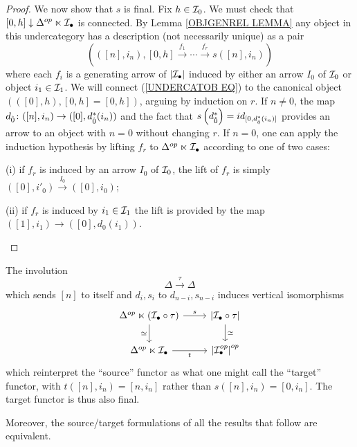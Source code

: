\documentclass[a4paper,10pt]{article}%
\begin{document}
\begin{proof}
We now show that $s$ is final.
Fix $h \in \mathcal{I}_0$. We must check that 
$[0,h] \downarrow \Delta^{op} \ltimes \mathcal{I}_{\bullet}$ is connected.
By Lemma \ref{OBJGENREL LEMMA} any object 
 in this undercategory has a description (not necessarily unique) as a pair
\begin{equation}\label{UNDERCATOB EQ}
\left(\left([n],i_n\right), [0,h] \xrightarrow{f_1} \cdots \xrightarrow{f_r} s([n],i_n) \right)
\end{equation}
where each $f_i$ is a generating arrow of $|\mathcal{I}_{\bullet}|$
induced by either an arrow $I_0$ of $\mathcal{I}_0$ or object $i_1\in \mathcal{I}_1$.
 We will connect (\ref{UNDERCATOB EQ}) to the canonical object 
 $\left(([0],h),[0,h]=[0,h]\right)$, arguing by induction on $r$. 
If $n \neq 0$, the map 
$d_{\hat{0}} \colon ([n],i_n) \to ([0],d_{\hat{0}}^{\**}(i_n))$
 and the fact that 
$s \left(d_{\hat{0}}^{\**}\right) = id_{[0, d_{\hat{0}}^{\**}(i_n)]}$ provides an arrow to an object with $n=0$ without changing $r$.
If $n=0$, one can apply the induction hypothesis by lifting $f_r$ to $\Delta^{op} \ltimes \mathcal{I}_{\bullet}$ according to one of two cases:
\begin{inparaenum}
	\item[(i)] if $f_r$ is induced by an arrow $I_0$ of $\mathcal{I}_0$, the lift of $f_r$ is simply  
	$([0],i'_0) \xrightarrow {I_0} ([0],i_0)$;
	\item[(ii)] if $f_r$ is induced by $i_1\in \mathcal{I}_1$ the lift is provided by the map
	$([1],i_1) \to ([0],d_0(i_1))$.
\end{inparaenum}
\end{proof}


\begin{remark}\label{DUALRESULTS REM}
	The involution
	\[\Delta \xrightarrow{\tau} \Delta\]
	which sends $[n]$ to itself and $d_i,s_i$ to $d_{n-i},s_{n-i}$
	induces vertical isomorphisms
\[
\begin{tikzcd}
	\Delta^{op} \ltimes \left(\mathcal{I}_{\bullet} \circ \tau \right) \ar{r}{s} \ar{d}[swap]{\simeq} &
	\left|\mathcal{I}_{\bullet} \circ \tau \right|
	\ar{d}{\simeq}
\\
	\Delta^{op} \ltimes \mathcal{I}_{\bullet} \ar{r}[swap]{t} &
	\left| \mathcal{I}_{\bullet}^{op} \right|^{op}
\end{tikzcd}
\]
which reinterpret the ``source'' functor as what one might call the ``target'' functor, with $t([n],i_n)= [n,i_n]$ rather than 
$s([n],i_n)= [0,i_n]$.
The target functor is thus also final.

Moreover, the source/target formulations of 
all the results that follow are equivalent.
\end{remark}
\end{document}
